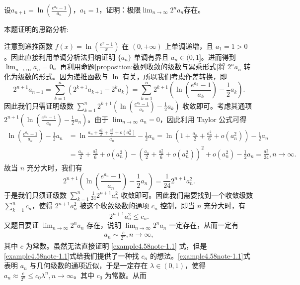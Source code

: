 \documentclass[../../main.tex]{subfiles}%
\begin{document}
\begin{example}
设\(a_{n + 1}=\ln\left(\frac{e^{a_n}-1}{a_n}\right)\)，\(a_1 = 1\)，证明：极限\(\lim_{n\rightarrow\infty}2^na_n\)存在。
\end{example}
\begin{note}
本题证明的思路分析:

注意到递推函数 \(f(x)=\ln\left(\frac{e^x - 1}{x}\right)\) 在 \((0, +\infty)\) 上单调递增，且 \(a_1 = 1>0\)。因此直接利用单调分析法归纳证明 \(\{ a_n \}\) 单调有界且 \(a_n\in(0, 1]\)。进而得到 \(\lim_{n \to \infty} a_n = 0\)。再利用\hyperref[proposition:数列收敛的级数与累乘形式]{命题\ref{proposition:数列收敛的级数与累乘形式}}将 \(2^n a_n\) 转化为级数的形式。因为递推函数与 \(\ln\) 有关，所以我们考虑作差转换，即
\[
2^{n + 1} a_{n + 1} = \sum_{k = 1}^n (2^{k + 1} a_{k + 1} - 2^k a_k) = \sum_{k = 1}^n 2^{k + 1}\left(\ln\left(\frac{e^{a_k} - 1}{a_k}\right) - \frac{1}{2} a_k\right).
\]
因此我们只需证明级数 \(\sum_{k = 1}^n 2^{k + 1}\left(\ln\left(\frac{e^{a_k} - 1}{a_k}\right) - \frac{1}{2} a_k\right)\) 收敛即可。考虑其通项 \(2^{n + 1}\left(\ln\left(\frac{e^{a_n} - 1}{a_n}\right) - \frac{1}{2} a_n\right)\)。由于 \(\lim_{n \to \infty} a_n = 0\)，因此利用 Taylor 公式可得
\begin{align*}
\ln\left(\frac{e^{a_n} - 1}{a_n}\right) - \frac{1}{2} a_n &= \ln\frac{a_n+\frac{a_n^2}{2}+\frac{a_n^3}{6}+o(a_n^3)}{a_n} - \frac{1}{2} a_n
= \ln\left(1 + \frac{a_n}{2}+\frac{a_n^2}{6}+o(a_n^2)\right) - \frac{1}{2} a_n\\
&= \frac{a_n}{2}+\frac{a_n^2}{6}+o(a_n^2) - \left(\frac{a_n}{2}+\frac{a_n^2}{6}+o(a_n^2)\right)^2 + o(a_n^2) - \frac{1}{2} a_n
= \frac{a_n^2}{24}, n \to \infty.
\end{align*}
故当 \(n\) 充分大时，我们有
\[
2^{n + 1}\left(\ln\left(\frac{e^{a_n} - 1}{a_n}\right) - \frac{1}{2} a_n\right) = \frac{1}{24} 2^{n + 1} a_n^2.
\]
于是我们只须证级数 \(\sum_{k = 1}^n \frac{1}{24} 2^{n + 1} a_n^2\) 收敛即可。因此我们需要找到一个收敛级数 \(\sum_{k = 1}^n c_n\)，使得 \(2^{n + 1} a_n^2\) 被这个收敛级数的通项 \(c_n\) 控制，即当 \(n\) 充分大时，有
\[
2^{n + 1} a_n^2 \leqslant  c_n.
\]
又题目要证 \(\lim_{n \to \infty} 2^n a_n\) 存在，说明 \(\lim_{n \to \infty} 2^n a_n\) 一定存在，从而一定有
\begin{align}
a_n \sim \frac{c}{2^n}, n \to \infty, \label{example4.58note-1.1}
\end{align}
其中 \(c\) 为常数。虽然无法直接证明 \eqref{example4.58note-1.1} 式，但是 \eqref{example4.58note-1.1}式给我们提供了一种找 \(c_n\) 的想法。\eqref{example4.58note-1.1}式表明 \(a_n\) 与几何级数的通项近似，于是一定存在 \(\lambda \in (0, 1)\)，使得 \(a_n \approx \frac{c}{2^n} \leqslant  c_0 \lambda ^n, n \to \infty\)。其中 \(c_0\) 为常数。从而

\end{note}
\end{document}
